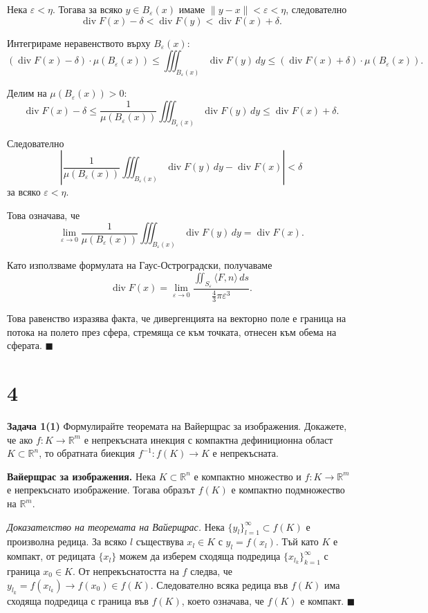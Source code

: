 \documentclass[10pt]{article}
\begin{document}
Нека $\varepsilon < \eta$. Тогава за всяко $y \in B_\varepsilon(x)$ имаме $\|y-x\| < \varepsilon < \eta$, следователно
\[
\operatorname{div} F(x) - \delta < \operatorname{div} F(y) < \operatorname{div} F(x) + \delta.
\]

Интегрираме неравенството върху $B_\varepsilon(x)$:
\[
(\operatorname{div} F(x) - \delta) \cdot \mu(B_\varepsilon(x)) \le \iiint_{B_\varepsilon(x)} \operatorname{div} F(y) \,dy \le (\operatorname{div} F(x) + \delta) \cdot \mu(B_\varepsilon(x)).
\]

Делим на $\mu(B_\varepsilon(x)) > 0$:
\[
\operatorname{div} F(x) - \delta \le \frac{1}{\mu(B_\varepsilon(x))} \iiint_{B_\varepsilon(x)} \operatorname{div} F(y) \,dy \le \operatorname{div} F(x) + \delta.
\]

Следователно
\[
\left| \frac{1}{\mu(B_\varepsilon(x))} \iiint_{B_\varepsilon(x)} \operatorname{div} F(y) \,dy - \operatorname{div} F(x) \right| < \delta
\]
за всяко $\varepsilon < \eta$.

Това означава, че
\[
\lim_{\varepsilon\to 0} \frac{1}{\mu(B_\varepsilon(x))} \iiint_{B_\varepsilon(x)} \operatorname{div} F(y) \,dy = \operatorname{div} F(x).
\]

Като използваме формулата на Гаус-Остроградски, получаваме
\[
\operatorname{div} F(x) = \lim_{\varepsilon\to 0} \frac{\iint_{S_\varepsilon} \langle F, n\rangle \,ds}{\frac{4}{3}\pi \varepsilon^3}.
\]

Това равенство изразява факта, че дивергенцията на векторно поле е граница на потока на полето през сфера, стремяща се към точката, отнесен към обема на сферата. $\blacksquare$


\section*{4}

\textbf{Задача 1(1) }Формулирайте теоремата на Вайерщрас за изображения. Докажете, че ако $f : K \to \mathbb{R}^m$ е непрекъсната инекция с компактна дефиниционна област $K \subset \mathbb{R}^n$, то обратната биекция $f^{-1} : f(K) \to K$ е непрекъсната. 

\textbf{Вайерщрас за изображения.} 
Нека $K \subset \mathbb{R}^n$ е компактно множество и $f : K \to \mathbb{R}^m$ е непрекъснато изображение. Тогава образът $f(K)$ е компактно подмножество на $\mathbb{R}^m$.

\textit{Доказателство на теоремата на Вайерщрас.} 
Нека $\{y_l\}_{l=1}^\infty \subset f(K)$ е произволна редица. За всяко $l$ съществува $x_l \in K$ с $y_l = f(x_l)$. Тъй като $K$ е компакт, от редицата $\{x_l\}$ можем да изберем сходяща подредица $\{x_{l_k}\}_{k=1}^\infty$ с граница $x_0 \in K$. От непрекъснатостта на $f$ следва, че $y_{l_k} = f(x_{l_k}) \to f(x_0) \in f(K)$. Следователно всяка редица във $f(K)$ има сходяща подредица с граница във $f(K)$, което означава, че $f(K)$ е компакт. $\blacksquare$
\end{document}
